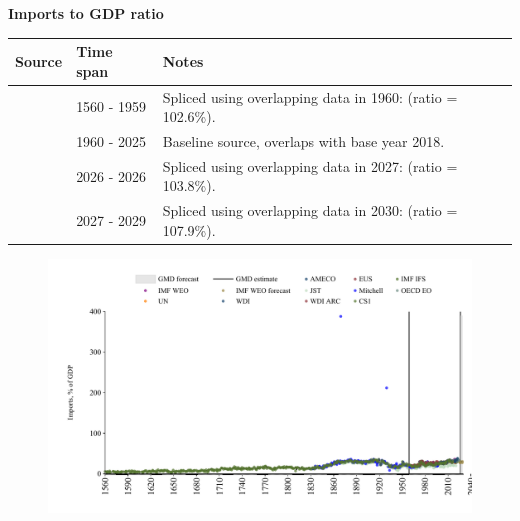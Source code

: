 \documentclass[12pt,a4paper,landscape]{article}
\begin{document}
\begin{adjustbox}{max totalsize={\paperwidth}{\paperheight},center}
\begin{minipage}[t][\textheight][t]{\textwidth}
\vspace*{0.5cm}
{}
\begin{center}
{\Large\bfseries Imports to GDP ratio}
\end{center}
\vspace{0.5cm}
\begin{table}[H]
\centering
\small
\begin{tabular}{|l|l|l|}
\hline
\textbf{Source} & \textbf{Time span} & \textbf{Notes} \\
\hline
\rowcolor{white}\cite{CS1_GBR}& 1560 - 1959 &Spliced using overlapping data in 1960: (ratio = 102.6\%). \\
\rowcolor{lightgray}\cite{OECD_EO}& 1960 - 2025 &Baseline source, overlaps with base year 2018. \\
\rowcolor{white}\cite{AMECO}& 2026 - 2026 &Spliced using overlapping data in 2027: (ratio = 103.8\%). \\
\rowcolor{lightgray}\cite{IMF_WEO_forecast}& 2027 - 2029 &Spliced using overlapping data in 2030: (ratio = 107.9\%). \\
\hline
\end{tabular}
\end{table}
\begin{figure}[H]
\centering
\includegraphics[width=\textwidth,height=0.6\textheight,keepaspectratio]{graphs/GBR_imports_GDP.pdf}
\end{figure}
\end{minipage}
\end{adjustbox}
\end{document}
